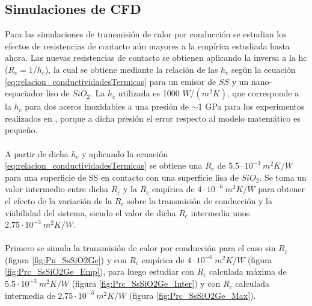\subsection{Simulaciones de CFD}
Para las simulaciones de transmisión de calor por conducción se estudian los efectos de resistencias de contacto aún mayores a la empírica estudiada hasta ahora. Las nuevas resistencias de contacto se obtienen aplicando la inversa a la \gls{hc} ($R_c=1/h_c$), la cual se obtiene mediante la relación de las $h_c$ según la ecuación \eqref{eq:relacion_conductividadesTermicas} para un emisor de $SS$ y un nano-espaciador liso de $SiO_2$. La $h_c$ utilizada es 1000 $W/(m^2 K)$, que corresponde a la $h_c$ para dos aceros inoxidables a una presión de $\sim$1 GPa para los experimentos realizados en \cite{experimental_Rc_SS}, porque a dicha presión el error respecto al modelo matemático es pequeño.\\\\
A partir de dicha $h_c$ y aplicando la ecuación \eqref{eq:relacion_conductividadesTermicas} se obtiene una $R_c$ de $5.5\cdot 10^{-3} \ m^2 K/W$ para una superficie de SS en contacto con una superficie lisa de $SiO_2$. Se toma un valor intermedio entre dicha $R_c$ y la $R_c$ empírica de $4\cdot 10^{-6} \ m^2 K/W$ \cite{nf_TPV_Pillars_SiO2} para obtener el efecto de la variación de la $R_c$ sobre la transmisión de conducción y la viabilidad del sistema, siendo el valor de dicha $R_c$ intermedia unos $2.75\cdot 10^{-3} \ m^2 K/W$.\\\\
Primero se simula la transmisión de calor por conducción para el caso sin $R_c$ (figura \ref{fig:Pn_SsSiO2Ge}) y con $R_c$ empírica de $4\cdot 10^{-6} \ m^2 K/W$ (figura \ref{fig:Prc_SsSiO2Ge_Emp}), para luego estudiar con $R_c$ calculada máxima de $5.5\cdot 10^{-3} \ m^2 K/W$ (figura \ref{fig:Prc_SsSiO2Ge_Inter}) y con $R_c$ calculada intermedia de $2.75\cdot 10^{-3} \ m^2 K/W$ (figura \ref{fig:Prc_SsSiO2Ge_Max}).
\graphicspath{ {./figuras/Resultados/conduccion/pdf/} }
